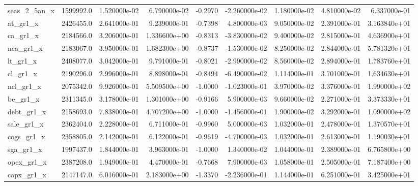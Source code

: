 \documentclass[12pt]{article}
\begin{document}
\begin{landscape}
\begin{longtable}{|l|r|r|r|r|r|r|r|r|}
seas\_2\_5an\_x            &  1599992.0 &  1.520000e-02 &  6.790000e-02 &     -0.2970 & -2.260000e-02 &  1.180000e-02 &  4.810000e-02 &  6.337000e-01 \\
at\_gr1\_x                &  2426455.0 &  2.641000e-01 &  9.239000e-01 &     -0.7398 &  4.800000e-03 &  9.050000e-02 &  2.391000e-01 &  3.163840e+01 \\
ca\_gr1\_x                &  2184566.0 &  3.206000e-01 &  1.336600e+00 &     -0.8313 & -3.830000e-02 &  9.400000e-02 &  2.815000e-01 &  4.636900e+01 \\
nca\_gr1\_x               &  2183067.0 &  3.950000e-01 &  1.682300e+00 &     -0.8737 & -1.530000e-02 &  8.250000e-02 &  2.844000e-01 &  5.781320e+01 \\
lt\_gr1\_x                &  2408077.0 &  3.042000e-01 &  9.791000e-01 &     -0.8021 & -2.990000e-02 &  8.560000e-02 &  2.894000e-01 &  1.783760e+01 \\
cl\_gr1\_x                &  2190296.0 &  2.996000e-01 &  8.898000e-01 &     -0.8494 & -6.490000e-02 &  1.114000e-01 &  3.701000e-01 &  1.634630e+01 \\
ncl\_gr1\_x               &  2075342.0 &  9.926000e-01 &  5.509500e+00 &     -1.0000 & -1.023000e-01 &  3.970000e-02 &  3.376000e-01 &  1.990000e+02 \\
be\_gr1\_x                &  2311345.0 &  3.178000e-01 &  1.301000e+00 &     -0.9166 &  5.900000e-03 &  9.660000e-02 &  2.271000e-01 &  3.373330e+01 \\
debt\_gr1\_x              &  2158693.0 &  7.838000e-01 &  4.707200e+00 &     -1.0000 & -1.456000e-01 &  1.900000e-02 &  3.292000e-01 &  1.090000e+02 \\
sale\_gr1\_x              &  2362404.0 &  2.228000e-01 &  6.711000e-01 &     -0.9960 &  5.000000e-03 &  1.032000e-01 &  2.478000e-01 &  1.370570e+01 \\
cogs\_gr1\_x              &  2358805.0 &  2.142000e-01 &  6.122000e-01 &     -0.9619 & -4.700000e-03 &  1.032000e-01 &  2.613000e-01 &  1.190030e+01 \\
sga\_gr1\_x               &  1997437.0 &  1.844000e-01 &  3.963000e-01 &     -1.0000 &  1.340000e-02 &  1.044000e-01 &  2.389000e-01 &  6.765800e+00 \\
opex\_gr1\_x              &  2387208.0 &  1.949000e-01 &  4.470000e-01 &     -0.7668 &  7.900000e-03 &  1.058000e-01 &  2.505000e-01 &  7.187400e+00 \\
capx\_gr1\_x              &  2147147.0 &  6.016000e-01 &  2.183000e+00 &     -1.3370 & -2.236000e-01 &  1.144000e-01 &  6.251000e-01 &  3.425000e+01 \\

\end{longtable}
\end{landscape}
\end{document}
